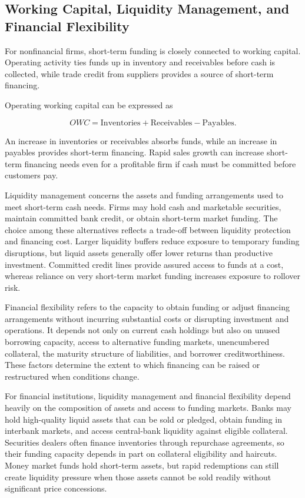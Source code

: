 \subsection{Working Capital, Liquidity Management, and Financial Flexibility}

For nonfinancial firms, short-term funding is closely connected to working capital. Operating activity ties funds up in inventory and receivables before cash is collected, while trade credit from suppliers provides a source of short-term financing.

Operating working capital can be expressed as

\begin{equation*}
OWC=\text{Inventories}+\text{Receivables}-\text{Payables}.
\label{eq:ch7-operating-working-capital}
\end{equation*}

An increase in inventories or receivables absorbs funds, while an increase in payables provides short-term financing. Rapid sales growth can increase short-term financing needs even for a profitable firm if cash must be committed before customers pay.

Liquidity management concerns the assets and funding arrangements used to meet short-term cash needs. Firms may hold cash and marketable securities, maintain committed bank credit, or obtain short-term market funding. The choice among these alternatives reflects a trade-off between liquidity protection and financing cost. Larger liquidity buffers reduce exposure to temporary funding disruptions, but liquid assets generally offer lower returns than productive investment. Committed credit lines provide assured access to funds at a cost, whereas reliance on very short-term market funding increases exposure to rollover risk.

Financial flexibility refers to the capacity to obtain funding or adjust financing arrangements without incurring substantial costs or disrupting investment and operations. It depends not only on current cash holdings but also on unused borrowing capacity, access to alternative funding markets, unencumbered collateral, the maturity structure of liabilities, and borrower creditworthiness. These factors determine the extent to which financing can be raised or restructured when conditions change.

For financial institutions, liquidity management and financial flexibility depend heavily on the composition of assets and access to funding markets. Banks may hold high-quality liquid assets that can be sold or pledged, obtain funding in interbank markets, and access central-bank liquidity against eligible collateral. Securities dealers often finance inventories through repurchase agreements, so their funding capacity depends in part on collateral eligibility and haircuts. Money market funds hold short-term assets, but rapid redemptions can still create liquidity pressure when those assets cannot be sold readily without significant price concessions.

